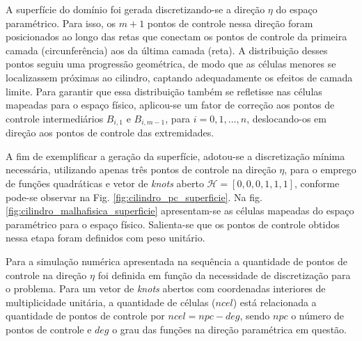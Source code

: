 \documentclass[tese_patricia]{subfiles}
\begin{document}
A superfície do domínio foi gerada discretizando-se a direção $\eta$ do espaço paramétrico. Para isso, os $m+1$ pontos de controle nessa direção foram posicionados ao longo das retas que conectam os pontos de controle da primeira camada (circunferência) aos da última camada (reta). A distribuição desses pontos seguiu uma progressão geométrica, de modo que as células menores se localizassem próximas ao cilindro, captando adequadamente os efeitos de camada limite. Para garantir que essa distribuição também se refletisse nas células mapeadas para o espaço físico, aplicou-se um fator de correção aos pontos de controle intermediários $B_{i,1}$ e $B_{i,m-1}$, para $i = 0, 1, \dots , n$, deslocando-os em direção aos pontos de controle das extremidades.

A fim de exemplificar a geração da superfície, adotou-se a discretização mínima necessária, utilizando apenas três pontos de controle na direção $\eta$, para o emprego de funções quadráticas e vetor de \textit{knots} aberto $\mathcal{H}=[0,0,0,1,1,1]$, conforme pode-se observar na Fig. \ref{fig:cilindro_pc_superficie}. Na fig. \ref{fig:cilindro_malhafisica_superficie} apresentam-se as células mapeadas do espaço paramétrico para o espaço físico. Salienta-se que os pontos de controle obtidos nessa etapa foram definidos com peso unitário.

Para a simulação numérica apresentada na sequência a quantidade de pontos de controle na direção $\eta$ foi definida em função da necessidade de discretização para o problema. Para um vetor de \textit{knots} abertos com coordenadas interiores de multiplicidade unitária, a quantidade de células ($ncel$) está relacionada a quantidade de pontos de controle por $ncel = npc-deg$, sendo $npc$ o número de pontos de controle e $deg$ o grau das funções na direção paramétrica em questão.
\end{document}
